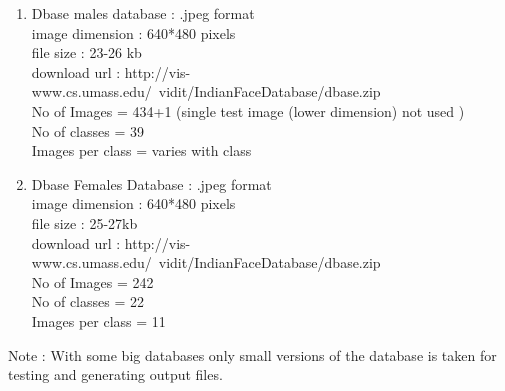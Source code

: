 \documentclass[10pt,a4paper]{article}
\begin{document}
\begin{enumerate}
\item Dbase males database : .jpeg format \\
   image dimension : 640*480 pixels \\
   file size : 23-26 kb \\
   download url : http://vis-www.cs.umass.edu/~vidit/IndianFaceDatabase/dbase.zip  \\
   No of Images = 434+1 (single test image (lower dimension) not used ) \\
   No of classes = 39 \\
   Images per class = varies with class \\

\item Dbase Females Database : .jpeg format \\
   image dimension : 640*480 pixels \\
   file size : 25-27kb \\
   download url : http://vis-www.cs.umass.edu/~vidit/IndianFaceDatabase/dbase.zip \\
   No of Images = 242 \\
   No of classes = 22 \\
   Images per class = 11 \\

\end{enumerate}

Note : With some big databases only small versions of the database is taken for testing and generating output files.
\end{document}
